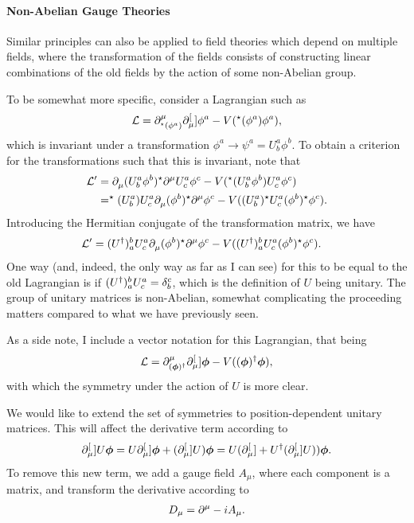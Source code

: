 \paragraph{Non-Abelian Gauge Theories}
Similar principles can also be applied to field theories which depend on multiple fields, where the transformation of the fields consists of constructing linear combinations of the old fields by the action of some non-Abelian group.

To be somewhat more specific, consider a Lagrangian such as
\begin{align*}
	\mathcal{L} = \partial^{\mu}_{^{\star}{(\phi^{a})}}\partial^{[}_{\mu}]{}{\phi^{a}} - V(^{\star}{(\phi^{a})}\phi^{a}),
\end{align*}
which is invariant under a transformation $\phi^{a} \to \psi^{a} = U_{b}^{a}\phi^{b}$. To obtain a criterion for the transformations such that this is invariant, note that
\begin{align*}
	\mathcal{L}^{\prime} &= \partial^{}_{\mu}{(U_{b}^{a}\phi^{b})^{\star}}\partial^{\mu}_{}U_{c}^{a}\phi^{c} - V(^{\star}{(U_{b}^{a}\phi^{b})}U_{c}^{a}\phi^{c}) \\
	              &= ^{\star}{(U_{b}^{a})}U_{c}^{a}\partial^{}_{\mu}(\phi^{b})^{\star}\partial^{\mu}_{}\phi^{c} - V((U_{b}^{a})^{\star} U_{c}^{a}(\phi^{b})^{\star}\phi^{c}).
\end{align*}
Introducing the Hermitian conjugate of the transformation matrix, we have
\begin{align*}
	\mathcal{L}^{\prime} &= (U^{\dagger})_{a}^{b}U_{c}^{a}\partial^{}_{\mu}(\phi^{b})^{\star}\partial^{\mu}_{}\phi^{c} - V((U^{\dagger})_{a}^{b}U_{c}^{a}(\phi^{b})^{\star}\phi^{c}).
\end{align*}
One way (and, indeed, the only way as far as I can see) for this to be equal to the old Lagrangian is if $(U^{\dagger})_{a}^{b}U_{c}^{a} = \kdelta{c}{b}$, which is the definition of $U$ being unitary. The group of unitary matrices is non-Abelian, somewhat complicating the proceeding matters compared to what we have previously seen.

As a side note, I include a vector notation for this Lagrangian, that being
\begin{align*}
	\mathcal{L} = \partial^{\mu}_{(\vb*{\phi})^{\dagger}}\partial^{[}_{\mu}]{}{\vb*{\phi}} - V((\vb*{\phi})^{\dagger}\vb*{\phi}),
\end{align*}
with which the symmetry under the action of $U$ is more clear.

We would like to extend the set of symmetries to position-dependent unitary matrices. This will affect the derivative term according to
\begin{align*}
	\partial^{[}_{\mu}]{}{U\vb*{\phi}} = U\partial^{[}_{\mu}]{}{\vb*{\phi}} + (\partial^{[}_{\mu}]{}{U})\vb*{\phi} = U(\partial^{[}_{\mu}]{}{} + U^{\dagger}(\partial^{[}_{\mu}]{}{U}))\vb*{\phi}.
\end{align*}
To remove this new term, we add a gauge field $A_{\mu}$, where each component is a matrix, and transform the derivative according to
\begin{align*}
	D_{\mu} = \partial^{\mu}_{} - iA_{\mu}.
\end{align*}

